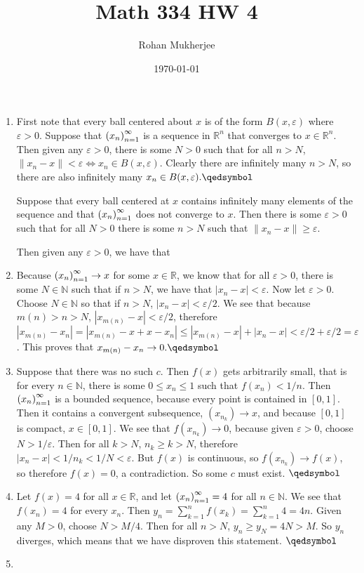 \documentclass[12pt]{article}
\title{Math 334 HW 4}
\date{\today}
\author{Rohan Mukherjee}
\def\mbb#1{\mathbb{#1}}
\def\bN{\mbb{N}}
\def\bR{\mbb{R}}
\theoremstyle{definition}
\theoremstyle{remark}
\newcommand{\R}{\mathbb{R}}
\newcommand{\mg}[1]{\| #1 \|}
\newcommand{\ve}{\varepsilon}
\renewcommand{\qed}{\hfill\qedsymbol}
\newcommand{\seq}[2]{\qty(#1_#2)_{#2=1}^{\infty}}
\renewcommand{\geq}{\geqslant}
\renewcommand{\leq}{\leqslant}
\begin{document}
	\maketitle
	\begin{enumerate}[leftmargin=\labelsep]
		\item 
		\fbox{$\implies$}
		
		First note that every ball centered about $x$ is of the form $B(x, \ve)$ where $ \ve > 0$. Suppose that $\seq{x}{n}$ is a sequence in $\R^n$ that converges to $x \in \R^n$.  Then given any $\ve > 0$, there is some $N > 0$ such that for all $n > N$, $\mg{x_n-x}<\ve \iff x_n \in B(x, \ve)$. Clearly there are infinitely many $n > N$, so there are also infinitely many $x_n \in B(x, \ve). \qed$
		
		\fbox{$\impliedby$} 
		
	Suppose that every ball centered at $x$ contains infinitely many elements of the sequence and that $\seq{x}{n}$ does not converge to $x$. Then there is some $\ve > 0$ such that for all $N>0$ there is some $n>N$ such that $\mg{x_n-x} \geq \ve$.
	
	Then given any $\ve > 0$, we have that 
	
	\item 
	Because $\seq{x}{n} \to x$ for some $x\in \bR$, we know that for all $\ve>0$, there is some $N \in \bN$ such that if $n>N$, we have that $|x_n-x|<\ve$. Now let $\ve>0$. Choose $N\in \bN$ so that if $n > N$, $|x_n-x|<\ve/2$. We see that because $m(n)>n>N$, $|x_{m(n)}-x| < \ve/2$, therefore $|x_{m(n)}-x_n| = |x_{m(n)}-x+x-x_n| \leq |x_{m(n)}-x|+|x_n-x| < \ve/2 + \ve/2 = \ve$. This proves that $x_{m(n)}-x_n \to 0. \qed$ 
		
	\item
	Suppose that there was no such $c$. Then $f(x)$ gets arbitrarily small, that is for every $n \in \bN$, there is some $0 \leq x_n \leq 1$ such that $f(x_n) < 1/n$. Then $\seq{x}{n}$ is a bounded sequence, because every point is contained in $[0, 1]$. Then it contains a convergent subsequence, $(x_{n_k}) \to x$, and because $[0, 1]$ is compact, $x \in [0, 1]$. We see that $f(x_{n_k}) \to 0$, because given $\ve > 0$, choose $N > 1/\ve$. Then for all $k > N$, $n_k \geq k > N$, therefore $|x_n-x| < 1/n_k < 1/N < \ve$. But $f(x)$ is continuous, so $f(x_{n_k}) \to f(x)$, so therefore $f(x)=0$, a contradiction. So some $c$ must exist. $\qed$
			
	\item 
	Let $f(x)=4$ for all $x \in \R$, and let $\seq{x}{n}=4$ for all $n \in \bN$. We see that $f(x_n)=4$ for every $x_n$. Then $y_n = \sum_{k=1}^{n} f(x_k) = \sum_{k=1}^{n} 4 = 4n$. Given any $M > 0$, choose $N > M/4$. Then for all $n > N$, $y_n \geq y_N = 4N > M$. So $y_n$ diverges, which means that we have disproven this statement. $\qed$
	
	\item 
	
	\end{enumerate}
\end{document}
